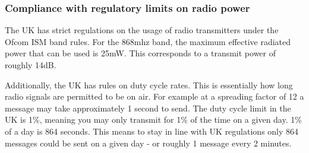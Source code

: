\subsubsection{Compliance with regulatory limits on radio power}

The UK has strict regulations on the usage of radio transmitters under the Ofcom ISM band rules.
For the 868mhz band, the maximum effective radiated power that can be used is 25mW. This corresponds to a transmit power of roughly 14dB.

Additionally, the UK has rules on duty cycle rates. This is essentially how long
radio signals are permitted to be on air. For example at a spreading factor of
12 a message may take approximately 1 second to send. The duty cycle limit in
the UK is 1\%, meaning you may only transmit for 1\% of the time on a given day.
1\% of a day is 864 seconds. This means to stay in line with UK regulations only
864 messages could be sent on a given day - or roughly 1 message every 2
minutes.